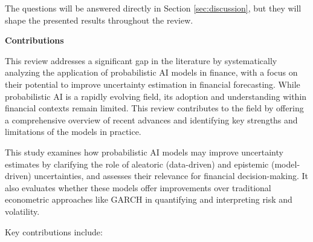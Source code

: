 The questions will be answered directly in Section \ref{sec:discussion}, but they will shape the presented results throughout the review. 

 
\textbf{Contributions}\nopagebreak

This review addresses a significant gap in the literature by systematically analyzing the application of probabilistic AI models in finance, with a focus on their potential to improve uncertainty estimation in financial forecasting. While probabilistic AI is a rapidly evolving field, its adoption and understanding within financial contexts remain limited. This review contributes to the field by offering a comprehensive overview of recent advances and identifying key strengths and limitations of the models in practice.

This study examines how probabilistic AI models may improve uncertainty estimates by clarifying the role of aleatoric (data-driven) and epistemic (model-driven) uncertainties, and assesses their relevance for financial decision-making. It also evaluates whether these models offer improvements over traditional econometric approaches like GARCH in quantifying and interpreting risk and volatility.

Key contributions include:

